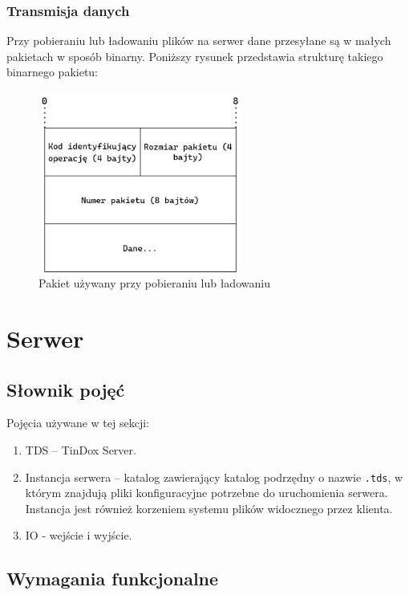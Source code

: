 \documentclass[10pt,a4paper]{article}
\begin{document}
\subsubsection{Transmisja danych}
Przy pobieraniu lub ładowaniu plików na serwer dane przesyłane są w małych pakietach w sposób binarny. Poniższy rysunek przedstawia strukturę takiego binarnego pakietu:

\begin{figure}[ht]
\centering
\includegraphics[width=0.6\textwidth]{./img/packet.png}
\caption{\label{fig:packet.png}Pakiet używany przy pobieraniu lub ładowaniu}
\end{figure}
\FloatBarrier

\pagebreak
\section{Serwer}

\subsection{Słownik pojęć}
\noindent Pojęcia używane w tej sekcji:
\begin{enumerate}
    \item TDS -- TinDox Server.
    \item Instancja serwera -- katalog zawierający katalog podrzędny o nazwie \texttt{.tds}, w którym znajdują pliki konfiguracyjne potrzebne do uruchomienia serwera. Instancja jest również korzeniem systemu plików widocznego przez klienta.
    \item IO - wejście i wyjście.
\end{enumerate}

\subsection{Wymagania funkcjonalne}
\end{document}
